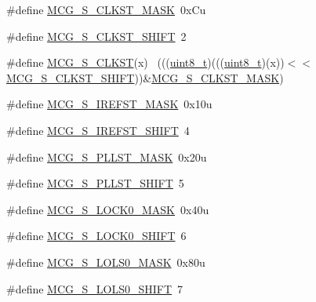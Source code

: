 \begin{DoxyCompactItemize}
\item 
\#define \hyperlink{group___m_c_g___register___masks_gaf43507c78cdda211a04b5ae0509edb2e}{M\+C\+G\+\_\+\+S\+\_\+\+C\+L\+K\+S\+T\+\_\+\+M\+A\+SK}~0x\+Cu
\item 
\#define \hyperlink{group___m_c_g___register___masks_gab0768a667adb2dc2e1fb7972f9fd85a4}{M\+C\+G\+\_\+\+S\+\_\+\+C\+L\+K\+S\+T\+\_\+\+S\+H\+I\+FT}~2
\item 
\#define \hyperlink{group___m_c_g___register___masks_gabb753abc57dbb658ff413c418d8b68c8}{M\+C\+G\+\_\+\+S\+\_\+\+C\+L\+K\+ST}(x)                                                  ~(((\hyperlink{_p_e___types_8h_aba7bc1797add20fe3efdf37ced1182c5}{uint8\+\_\+t})(((\hyperlink{_p_e___types_8h_aba7bc1797add20fe3efdf37ced1182c5}{uint8\+\_\+t})(x))$<$$<$\hyperlink{group___m_c_g___register___masks_gab0768a667adb2dc2e1fb7972f9fd85a4}{M\+C\+G\+\_\+\+S\+\_\+\+C\+L\+K\+S\+T\+\_\+\+S\+H\+I\+FT}))\&\hyperlink{group___m_c_g___register___masks_gaf43507c78cdda211a04b5ae0509edb2e}{M\+C\+G\+\_\+\+S\+\_\+\+C\+L\+K\+S\+T\+\_\+\+M\+A\+SK})
\item 
\#define \hyperlink{group___m_c_g___register___masks_ga5bf822a90d9c1e67d5297420157e1dd0}{M\+C\+G\+\_\+\+S\+\_\+\+I\+R\+E\+F\+S\+T\+\_\+\+M\+A\+SK}~0x10u
\item 
\#define \hyperlink{group___m_c_g___register___masks_ga4a2727883c339845e709dacc0c2fd71a}{M\+C\+G\+\_\+\+S\+\_\+\+I\+R\+E\+F\+S\+T\+\_\+\+S\+H\+I\+FT}~4
\item 
\#define \hyperlink{group___m_c_g___register___masks_ga6f176d95968a5b7b1af67ae81734c854}{M\+C\+G\+\_\+\+S\+\_\+\+P\+L\+L\+S\+T\+\_\+\+M\+A\+SK}~0x20u
\item 
\#define \hyperlink{group___m_c_g___register___masks_gafddddab311f8f0cb58e7b7941f6d9a8d}{M\+C\+G\+\_\+\+S\+\_\+\+P\+L\+L\+S\+T\+\_\+\+S\+H\+I\+FT}~5
\item 
\#define \hyperlink{group___m_c_g___register___masks_ga6cb486757d45c5211baa3b130e720b97}{M\+C\+G\+\_\+\+S\+\_\+\+L\+O\+C\+K0\+\_\+\+M\+A\+SK}~0x40u
\item 
\#define \hyperlink{group___m_c_g___register___masks_ga5022e367019ecb07d0afbc3279e60b02}{M\+C\+G\+\_\+\+S\+\_\+\+L\+O\+C\+K0\+\_\+\+S\+H\+I\+FT}~6
\item 
\#define \hyperlink{group___m_c_g___register___masks_gae5967720d747b4d6f9fa748c94570c6d}{M\+C\+G\+\_\+\+S\+\_\+\+L\+O\+L\+S0\+\_\+\+M\+A\+SK}~0x80u
\item 
\#define \hyperlink{group___m_c_g___register___masks_ga5cddd795823b73d50830e628cee24644}{M\+C\+G\+\_\+\+S\+\_\+\+L\+O\+L\+S0\+\_\+\+S\+H\+I\+FT}~7
$$
\end{DoxyCompactItemize}
